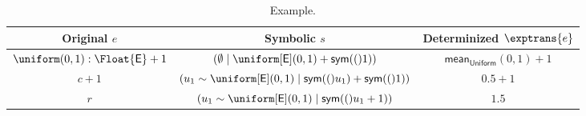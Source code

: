 \begin{table}[t]
  \centering
  \small
  \renewcommand{\arraystretch}{1.25}
  \begin{tabular*}{\linewidth}{@{\extracolsep{\fill}}ccc@{}}
    \toprule
    \textbf{Original $e$} &
    \textbf{Symbolic $s$} &
    \textbf{Determinized $\exptrans{e}$} \\
    \midrule
    $\uniform(0,1) : \Float{\E} +1$ &
    $(\emptyset \mid \uniform[\E](0,1)+\sym(1))$ &
    $\mathsf{mean}_{\mathsf{Uniform}}(0,1)+1$ \\[1.2em]
    $c+1$ &
    $(u_1\sim\uniform[\E](0,1) \mid \sym(u_1)+\sym(1))$ &
    $0.5+1$ \\[1.2em]
    $r$ &
    $(u_1\sim\uniform[\E](0,1) \mid \sym(u_1+1))$ &
    $1.5$ \\
    \bottomrule
  \end{tabular*}
  \caption{
    Example.
  }
  \label{tab:uniform-step-correspondence}
\end{table}
